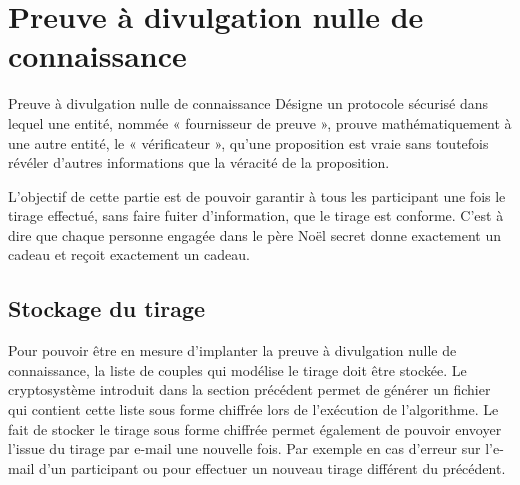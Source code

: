 \documentclass[a4paper, 12pt]{report}
\begin{document}
    \section{Preuve à divulgation nulle de connaissance}
            \begin{definition}{Preuve à divulgation nulle de connaissance}{}
                Désigne un protocole sécurisé dans lequel une entité, nommée « fournisseur de preuve », prouve mathématiquement à une autre entité, le « vérificateur », qu'une proposition est vraie sans toutefois révéler d'autres informations que la véracité de la proposition.\footnotemark
            \end{definition}
            L'objectif de cette partie est de pouvoir garantir à tous les participant une fois le tirage effectué, sans faire fuiter d'information,  que le tirage est conforme. C'est à dire que chaque personne engagée dans le père Noël secret donne exactement un cadeau et reçoit exactement un cadeau.
        \subsection{Stockage du tirage}
            Pour pouvoir être en mesure d'implanter la preuve à divulgation nulle de connaissance, la liste de couples qui modélise le tirage doit être stockée. Le cryptosystème introduit dans la section précédent permet de générer un fichier qui contient cette liste sous forme chiffrée lors de l'exécution de l'algorithme. 
            \bigbreak
            Le fait de stocker le tirage sous forme chiffrée permet également de pouvoir envoyer l'issue du tirage par e-mail une nouvelle fois. Par exemple en cas d'erreur sur l'e-mail d'un participant ou pour effectuer un nouveau tirage différent du précédent.
\end{document}
